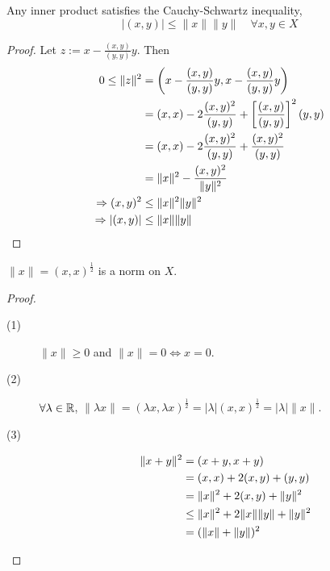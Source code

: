 \begin{prop}
    Any inner product satisfies the Cauchy-Schwartz inequality,
    \[
        \left| (x, y) \right| \leq \| x \| \| y \| \quad \forall x, y \in X
    \] 
\end{prop}
\begin{proof}
    Let $z := x - \frac{(x, y)}{(y, y)}y$. Then
    \begin{align*}
        0 \leq \| z \|^2 &= \left(x - \frac{(x, y)}{(y, y)}y, x - \frac{(x, y)}{(y, y)}y \right) \\
        &= (x, x) - 2\frac{(x, y)^2}{(y, y)} + \left[\frac{(x, y)}{(y, y)}\right]^2(y, y) \\
        &= (x, x) - 2\frac{(x, y)^2}{(y, y)} + \frac{(x, y)^2}{(y, y)} \\
        &= \| x \|^2 - \frac{(x, y)^2}{\| y \|^2} \\
        \Rightarrow (x, y)^2 &\leq \| x \|^2 \| y \|^2 \\
        \Rightarrow |(x, y)| &\leq \| x \| \| y \| \qedhere
    \end{align*}  
\end{proof}

\begin{cor}
    $\| x \| = (x, x)^{\frac{1}{2}}$ is a norm on $X$.
\end{cor}
\begin{proof} \leavevmode
    \begin{description}
        \item[(1)] $\| x \| \geq 0$ and $\| x \| = 0 \iff x = 0$.
            \item[(2)] $\forall \lambda \in \mathbb{R}$, $\| \lambda x \| = (\lambda x, \lambda x)^
            {\frac{1}{2}} = |\lambda| (x, x)^{\frac{1}{2}} = |\lambda| \| x \|$.
            \item[(3)] 
            \[
            \begin{aligned}
                \| x + y \|^2 &= (x + y, x + y) \\
                &= (x, x) + 2(x, y) + (y, y) \\
                &= \| x \|^2 + 2(x, y) + \| y \|^2 \\
                &\leq \| x \|^2 + 2\| x \| \| y \| + \| y \|^2 \\
                &= (\| x \| + \| y \|)^2 \qedhere
            \end{aligned}
            \]
    \end{description}
\end{proof}

